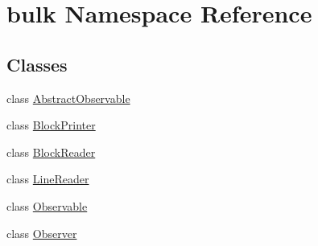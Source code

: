 \hypertarget{namespacebulk}{}\section{bulk Namespace Reference}
\label{namespacebulk}
\subsection*{Classes}
\begin{DoxyCompactItemize}
\item 
class \hyperlink{classbulk_1_1AbstractObservable}{Abstract\+Observable}
\item 
class \hyperlink{classbulk_1_1BlockPrinter}{Block\+Printer}
\item 
class \hyperlink{classbulk_1_1BlockReader}{Block\+Reader}
\item 
class \hyperlink{classbulk_1_1LineReader}{Line\+Reader}
\item 
class \hyperlink{classbulk_1_1Observable}{Observable}
\item 
class \hyperlink{classbulk_1_1Observer}{Observer}
\end{DoxyCompactItemize}
